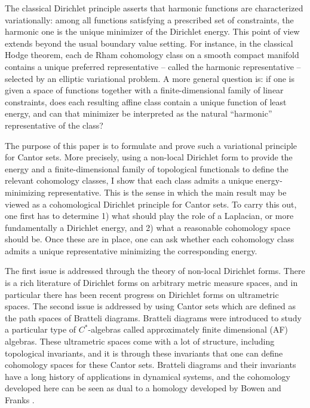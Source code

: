 \documentclass[12pt]{amsart}
\theoremstyle{plain}
\theoremstyle{definition}
\begin{document}
The classical Dirichlet principle asserts that harmonic functions are characterized variationally: among all functions satisfying a prescribed set of constraints, the harmonic one is the unique minimizer of the Dirichlet energy. This point of view extends beyond the usual boundary value setting. For instance, in the classical Hodge theorem, each de Rham cohomology class on a smooth compact manifold contains a unique preferred representative -- called the harmonic representative -- selected by an elliptic variational problem. A more general question is: if one is given a space of functions together with a finite-dimensional family of linear constraints, does each resulting affine class contain a unique function of least energy, and can that minimizer be interpreted as the natural “harmonic” representative of the class?

The purpose of this paper is to formulate and prove such a variational principle for Cantor sets. More precisely, using a non-local Dirichlet form to provide the energy and a finite-dimensional family of topological functionals to define the relevant cohomology classes, I show that each class admits a unique energy-minimizing representative. This is the sense in which the main result may be viewed as a cohomological Dirichlet principle for Cantor sets. To carry this out, one first has to determine 1) what should play the role of a Laplacian, or more fundamentally a Dirichlet energy, and 2) what a reasonable cohomology space should be. Once these are in place, one can ask whether each cohomology class admits a unique representative minimizing the corresponding energy.

The first issue is addressed through the theory of non-local Dirichlet forms. There is a rich literature of Dirichlet forms on arbitrary metric measure spaces, and in particular there has been recent progress on Dirichlet forms on ultrametric spaces. The second issue is addressed by using Cantor sets which are defined as the path spaces of Bratteli diagrams. Bratteli diagrams were introduced to study a particular type of $C^*$-algebras called approximately finite dimensional (AF) algebras. These ultrametric spaces come with a lot of structure, including topological invariants, and it is through these invariants that one can define cohomology spaces for these Cantor sets. Bratteli diagrams and their invariants have a long history of applications in dynamical systems, and the cohomology developed here can be seen as dual to a homology developed by Bowen and Franks \cite{BowenFranks:homology}.
\end{document}
